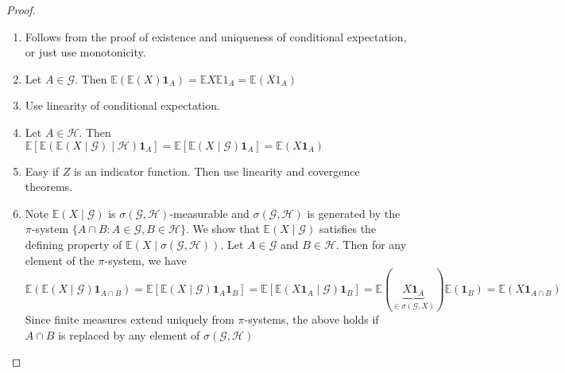 \documentclass[parskip=full]{article}
\theoremstyle{definition}
\newcommand{\1}{\mathbbm{1}}
\newcommand{\E}{\mathbb{E}}
\begin{document}
\begin{proof}
    \begin{enumerate}
        \item Follows from the proof of existence and uniqueness of conditional expectation, or just use monotonicity.
        \item Let $A \in \mathcal{G}$. Then $\E( \E(X) \mathbf{1}_A) = \E X \E 1_A = \E (X 1_A)$
        \item Use linearity of conditional expectation.
        \item Let $A \in \mathcal{H}$. Then $\E\left[\E(\E(X \mid \mathcal{G}) \mid \mathcal{H}) \mathbf{1}_A \right] = \E [\E(X \mid \mathcal{G}) \mathbf{1}_A] = \E(X \mathbf{1}_A)$
        \item Easy if $Z$ is an indicator function. Then use linearity and covergence theorems.
        \item Note $\E (X \mid \mathcal{G})$ is $\sigma(\mathcal{G}, \mathcal{H})$-measurable and $\sigma(\mathcal{G}, \mathcal{H})$ is generated by the $\pi$-system $\{A \cap B: A \in \mathcal{G}, B \in \mathcal{H}\}$. We show that $\E(X \mid \mathcal{G})$ satisfies the defining property of $\E(X \mid \sigma(\mathcal{G}, \mathcal{H}))$. Let $A \in \mathcal{G}$ and $B \in \mathcal{H}$. Then for any element of the $\pi$-system, we have
        \[
               \E(\E(X \mid \mathcal{G}) \mathbf{1}_{A \cap B}) = \E [\E(X \mid \mathcal{G}) \mathbf{1}_A \mathbf{1}_B] = \E [\E(X \mathbf{1}_A \mid \mathcal{G}) \mathbf{1}_B] = \E(\underbrace{X \mathbf{1}_A}_{\in \sigma(\mathcal{G}, X)}) \E(\mathbf{1}_B) = \E(X \mathbf{1}_{A \cap B})
        \]
        Since finite measures extend uniquely from $\pi$-systems, the above holds if $A\cap B$ is replaced by any element of $\sigma(\mathcal{G}, \mathcal{H})$
    \end{enumerate}
\end{proof}
\end{document}
